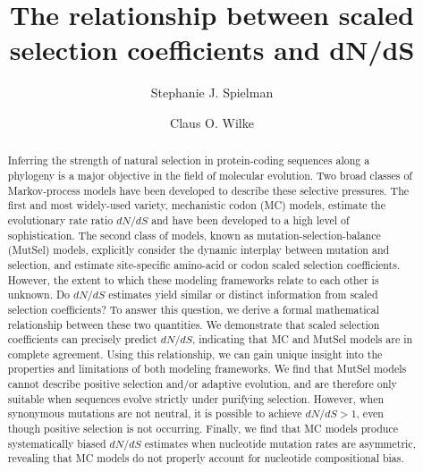 \documentclass{pnastwo}
\begin{document}
	
	
\title{The relationship between scaled selection coefficients and dN/dS}
	
\author{Stephanie J. Spielman 
	\and
	Claus O. Wilke
}
	
\maketitle

\begin{article}
		
\begin{abstract} %
Inferring the strength of natural selection in protein-coding sequences along a phylogeny is a major objective in the field of molecular evolution. Two broad classes of Markov-process models have been developed to describe these selective pressures. The first and most widely-used variety, mechanistic codon (MC) models, estimate the evolutionary rate ratio $dN/dS$ and have been developed to a high level of sophistication. The second class of models, known as mutation-selection-balance (MutSel) models, explicitly consider the dynamic interplay between mutation and selection, and estimate site-specific amino-acid or codon scaled selection coefficients. However, the extent to which these modeling frameworks relate to each other is unknown. Do $dN/dS$ estimates yield similar or distinct information from scaled selection coefficients? To answer this question, we derive a formal mathematical relationship between these two quantities. We demonstrate that scaled selection coefficients can precisely predict $dN/dS$, indicating that MC and MutSel models are in complete agreement. Using this relationship, we can gain unique insight into the properties and limitations of both modeling frameworks. We find that MutSel models cannot describe positive selection and/or adaptive evolution, and are therefore only suitable when sequences evolve strictly under purifying selection. However, when synonymous mutations are not neutral, it is possible to achieve $dN/dS > 1$, even though positive selection is not occurring. Finally, we find that MC models produce systematically biased $dN/dS$ estimates when nucleotide mutation rates are asymmetric, revealing that MC models do not properly account for nucleotide compositional bias.
\end{abstract}
		

\end{article}
\end{document}
